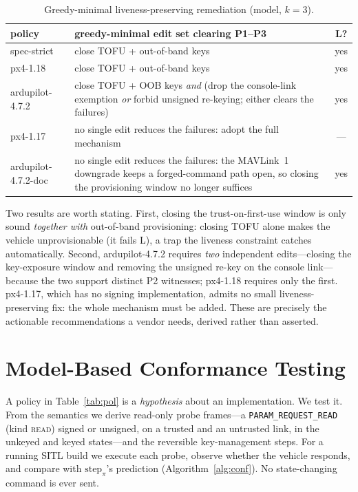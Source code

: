 \documentclass[conference]{IEEEtran}
\newcommand{\code}[1]{\texttt{#1}}
\newcommand{\prop}[1]{\textsf{#1}}
\begin{document}
\begin{table}[t]
\caption{Greedy-minimal liveness-preserving remediation (model, $k{=}3$).}
\label{tab:edits}
\centering\footnotesize\setlength{\tabcolsep}{4pt}
\begin{tabular}{@{}lp{3.1cm}c@{}}
\toprule
policy & greedy-minimal edit set clearing \prop{P1}--\prop{P3} & \prop{L}? \\
\midrule
\textsf{spec-strict}     & close TOFU + out-of-band keys & yes \\
\textsf{px4-1.18}        & close TOFU + out-of-band keys & yes \\
\textsf{ardupilot-4.7.2} & close TOFU + OOB keys \emph{and} (drop the console-link exemption \emph{or} forbid unsigned re-keying; either clears the failures) & yes \\
\textsf{px4-1.17}        & no single edit reduces the failures: adopt the full mechanism & --- \\
\textsf{ardupilot-4.7.2-doc} & no single edit reduces the failures: the MAVLink~1 downgrade keeps a forged-command path open, so closing the provisioning window no longer suffices & yes \\
\bottomrule
\end{tabular}
\end{table}

Two results are worth stating. First, closing the trust-on-first-use window is
only sound \emph{together with} out-of-band provisioning: closing TOFU alone
makes the vehicle unprovisionable (it fails \prop{L}), a trap the liveness
constraint catches automatically. Second, \textsf{ardupilot-4.7.2} requires
\emph{two} independent edits---closing the key-exposure window and removing the
unsigned re-key on the console link---because the two support distinct \prop{P2}
witnesses; \textsf{px4-1.18} requires only the first. \textsf{px4-1.17}, which
has no signing implementation, admits no small liveness-preserving fix: the whole
mechanism must be added. These are precisely the actionable recommendations a
vendor needs, derived rather than asserted.

\section{Model-Based Conformance Testing}
\label{sec:conf}

A policy in Table~\ref{tab:pol} is a \emph{hypothesis} about an implementation.
We test it. From the semantics we derive read-only probe frames---a
\code{PARAM\_REQUEST\_READ} (kind \textsc{read}) signed or unsigned, on a trusted
and an untrusted link, in the unkeyed and keyed states---and the reversible
key-management steps. For a running SITL build we execute each probe, observe
whether the vehicle responds, and compare with $\mathrm{step}_\pi$'s prediction
(Algorithm~\ref{alg:conf}). No state-changing command is ever sent.
\end{document}
